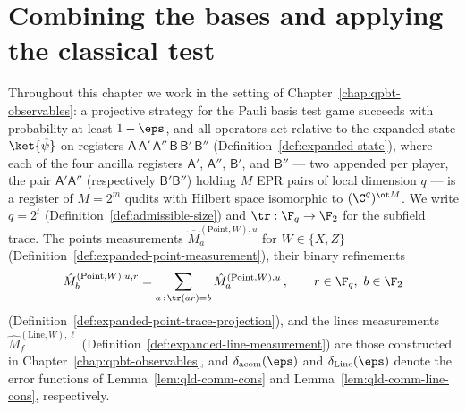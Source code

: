 \chapter{Combining the bases and applying the classical test}
\label{chap:qpbt-combining}
\label{sec:combining}

Throughout this chapter we work in the setting of
Chapter~\ref{chap:qpbt-observables}: a projective strategy for the Pauli basis
test game succeeds with probability at least $1-\eps$, and all operators act
relative to the expanded state $\ket{\hat\psi}$ on registers
$\mathsf{A}\,\mathsf{A}'\,\mathsf{A}''\,\mathsf{B}\,\mathsf{B}'\,\mathsf{B}''$
(Definition~\ref{def:expanded-state}), where each of the four ancilla
registers $\mathsf{A}'$, $\mathsf{A}''$, $\mathsf{B}'$, and $\mathsf{B}''$
--- two appended per player, the pair $\mathsf{A}'\mathsf{A}''$
(respectively $\mathsf{B}'\mathsf{B}''$) holding $M$ EPR pairs of local
dimension $q$ --- is a register of $M = 2^m$ qudits with Hilbert space
isomorphic to $(\C^q)^{\ot M}$.
We write $q = 2^t$ (Definition~\ref{def:admissible-size}) and
$\tr:\F_q\to\F_2$ for the subfield trace. The points measurements
$\hat{M}^{(\mathrm{Point},W),u}_a$ for $W \in \{X,Z\}$
(Definition~\ref{def:expanded-point-measurement}), their binary refinements
\[
	\hat{M}^{(\mathrm{Point},W),u,r}_b
	= \sum_{a \,:\, \tr(ar) = b} \hat{M}^{(\mathrm{Point},W),u}_a\,,
	\qquad r \in \F_q,\ b \in \F_2
\]
(Definition~\ref{def:expanded-point-trace-projection}), and the lines
measurements $\hat{M}^{(\mathrm{Line},W),\ell}_{f}$
(Definition~\ref{def:expanded-line-measurement}) are those constructed in
Chapter~\ref{chap:qpbt-observables}, and $\delta_{\mathrm{acom}}(\eps)$ and
$\delta_{\mathrm{Line}}(\eps)$ denote the error functions of
Lemma~\ref{lem:qld-comm-cons} and Lemma~\ref{lem:qld-comm-line-cons},
respectively.


